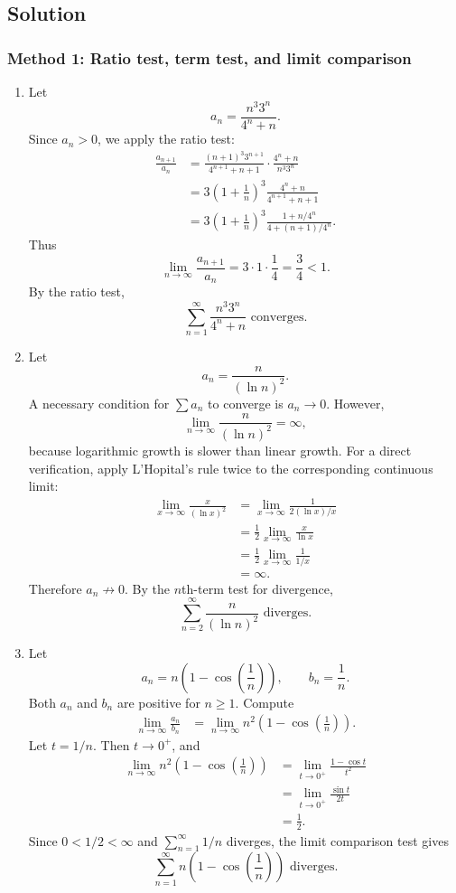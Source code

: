 \documentclass[12pt]{article}
\begin{document}
\newpage
\subsection{Solution}

\subsubsection{Method 1: Ratio test, term test, and limit comparison}

\begin{enumerate}[label=(\alph*)]
\item Let
\[
a_n=\frac{n^3 3^n}{4^n+n}.
\]
Since $a_n>0$, we apply the ratio test:
\begin{align*}
\frac{a_{n+1}}{a_n}
&=\frac{(n+1)^3 3^{n+1}}{4^{n+1}+n+1}\cdot \frac{4^n+n}{n^3 3^n} \\
&=3\left(1+\frac1n\right)^3\frac{4^n+n}{4^{n+1}+n+1} \\
&=3\left(1+\frac1n\right)^3\frac{1+n/4^n}{4+(n+1)/4^n}.
\end{align*}
Thus
\[
\lim_{n\to\infty}\frac{a_{n+1}}{a_n}
=3\cdot 1\cdot \frac14
=\frac34<1.
\]
By the ratio test,
\[
\boxed{\displaystyle \sum_{n=1}^{\infty}\frac{n^3 3^n}{4^n+n}\text{ converges.}}
\]

\item Let
\[
a_n=\frac{n}{(\ln n)^2}.
\]
A necessary condition for $\sum a_n$ to converge is $a_n\to 0$. However,
\[
\lim_{n\to\infty}\frac{n}{(\ln n)^2}=\infty,
\]
because logarithmic growth is slower than linear growth. For a direct verification, apply L'Hopital's rule twice to the corresponding continuous limit:
\begin{align*}
\lim_{x\to\infty}\frac{x}{(\ln x)^2}
&=\lim_{x\to\infty}\frac{1}{2(\ln x)/x} \\
&=\frac12\lim_{x\to\infty}\frac{x}{\ln x} \\
&=\frac12\lim_{x\to\infty}\frac{1}{1/x} \\
&=\infty.
\end{align*}
Therefore $a_n\not\to 0$. By the $n$th-term test for divergence,
\[
\boxed{\displaystyle \sum_{n=2}^{\infty}\frac{n}{(\ln n)^2}\text{ diverges.}}
\]

\item Let
\[
a_n=n\left(1-\cos\left(\frac1n\right)\right),
\qquad
b_n=\frac1n.
\]
Both $a_n$ and $b_n$ are positive for $n\geq 1$. Compute
\begin{align*}
\lim_{n\to\infty}\frac{a_n}{b_n}
&=\lim_{n\to\infty}n^2\left(1-\cos\left(\frac1n\right)\right).
\end{align*}
Let $t=1/n$. Then $t\to 0^+$, and
\begin{align*}
\lim_{n\to\infty}n^2\left(1-\cos\left(\frac1n\right)\right)
&=\lim_{t\to 0^+}\frac{1-\cos t}{t^2} \\
&=\lim_{t\to 0^+}\frac{\sin t}{2t} \\
&=\frac12.
\end{align*}
Since $0<1/2<\infty$ and $\sum_{n=1}^{\infty}1/n$ diverges, the limit comparison test gives
\[
\boxed{\displaystyle \sum_{n=1}^{\infty}n\left(1-\cos\left(\frac1n\right)\right)\text{ diverges.}}
\]
\end{enumerate}
\end{document}
